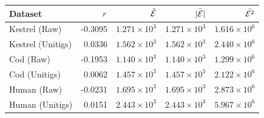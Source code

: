 \begin{tabular}{lrrrr}
\toprule
Dataset & $r$ & $\bar{\mathcal{E}}$ & $\bar{|\mathcal{E}|}$ & $\bar{\mathcal{E}^2}$ \\
\midrule
Kestrel (Raw) & -0.3095 & $1.271 \times 10^{3}$ & $1.271 \times 10^{3}$ & $1.616 \times 10^{6}$ \\
Kestrel (Unitigs) & 0.0336 & $1.562 \times 10^{3}$ & $1.562 \times 10^{3}$ & $2.440 \times 10^{6}$ \\
Cod (Raw) & -0.1953 & $1.140 \times 10^{3}$ & $1.140 \times 10^{3}$ & $1.299 \times 10^{6}$ \\
Cod (Unitigs) & 0.0062 & $1.457 \times 10^{3}$ & $1.457 \times 10^{3}$ & $2.122 \times 10^{6}$ \\
Human (Raw) & -0.0231 & $1.695 \times 10^{3}$ & $1.695 \times 10^{3}$ & $2.873 \times 10^{6}$ \\
Human (Unitigs) & 0.0151 & $2.443 \times 10^{3}$ & $2.443 \times 10^{3}$ & $5.967 \times 10^{6}$ \\
\bottomrule
\end{tabular}